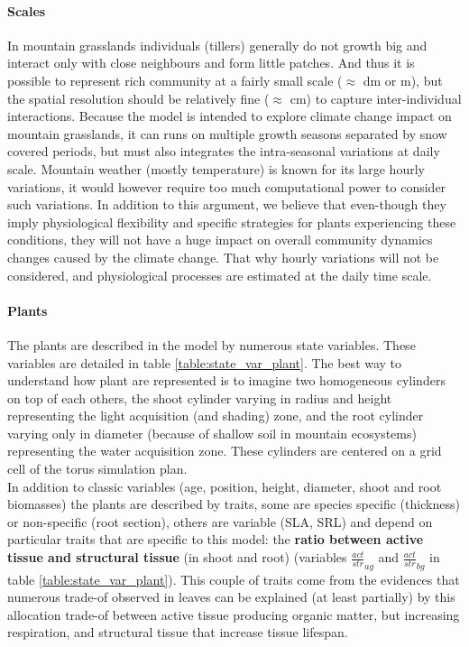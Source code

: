 \documentclass[a4paper,twoside, justified,marginals=raggedright]{tufte-handout}
\begin{document}
\paragraph{Scales} In mountain grasslands individuals (tillers) generally do not growth big and interact only with close neighbours and form little patches. And thus it is possible to represent rich community at a fairly small scale ($\approx$ dm or m), but the spatial resolution should be relatively fine ($\approx$ cm) to capture inter-individual interactions. Because the model is intended to explore climate change impact on mountain grasslands, it can runs on multiple growth seasons separated by snow covered periods, but must also integrates the intra-seasonal variations at daily scale. Mountain weather (mostly temperature) is known for its large hourly variations, it would however require too much computational power to consider such variations. In addition  to this argument, we believe that even-though  they imply physiological flexibility and specific strategies for plants experiencing these conditions, they will not have a huge impact on overall community dynamics changes caused by the climate change. That why hourly variations will not be considered, and physiological processes are estimated at the daily time scale.

\paragraph{Plants} The plants are described in the model by numerous state variables. These variables are detailed in table \ref{table:state_var_plant}. The best way to understand how plant are represented is to imagine two homogeneous cylinders on top of each others, the shoot cylinder varying in radius and height representing the light acquisition (and shading) zone, and the root cylinder varying only in diameter (because of shallow soil in mountain ecosystems) representing the water acquisition zone. These cylinders are centered on a grid cell of the torus simulation plan.\\
\indent In addition to classic variables (age, position, height, diameter, shoot and root biomasses) the plants are described by traits, some are species specific (thickness) or non-specific (root section), others are variable (SLA, SRL) and depend on particular traits that are specific to this model: the \textbf{ratio between active tissue and structural tissue} (in shoot and root) (variables $\frac{act}{str}_{ag}$ and $\frac{act}{str}_{bg}$ in table \ref{table:state_var_plant}). This couple of traits come from the evidences that numerous trade-of observed in leaves can be explained (at least partially) by this allocation trade-of between active tissue producing organic matter, but increasing respiration, and structural tissue that increase tissue lifespan.
\end{document}
